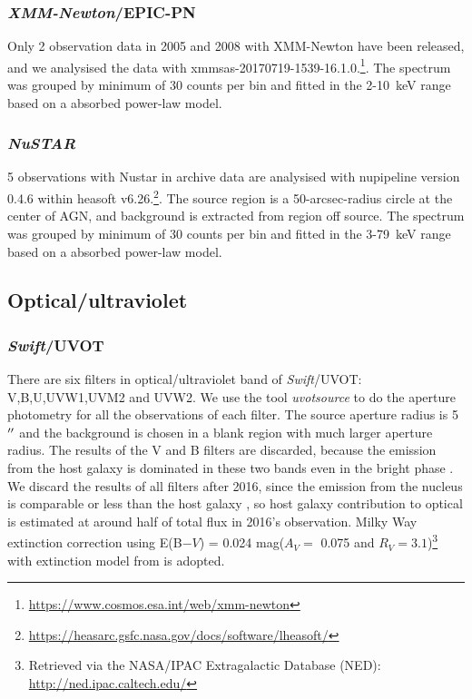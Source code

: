 \documentclass{aastex63}
\newcommand{\xmm}{{\em XMM-Newton}}
\newcommand{\nustar}{{\em NuSTAR}}
\newcommand{\swift}{{\em Swift}}
\begin{document}
\subsubsection{\xmm/EPIC-PN}
Only 2 observation data in 2005 and 2008 with XMM-Newton have been released, and we analysised the data with xmmsas-20170719-1539-16.1.0.\footnote{\url{https://www.cosmos.esa.int/web/xmm-newton}}. The spectrum was grouped by minimum of 30 counts per bin and fitted in the 2-10~keV range based on a absorbed power-law model. 

\subsubsection{\nustar}
5 observations with Nustar in archive data are analysised with nupipeline version 0.4.6 within heasoft v6.26.\footnote{\url{https://heasarc.gsfc.nasa.gov/docs/software/lheasoft/}}. The source region is a 50-arcsec-radius circle at the center of AGN, and background is extracted from region off source. The spectrum was grouped by minimum of 30 counts per bin and fitted in the 3-79~keV range based on a absorbed power-law model.


\subsection{Optical/ultraviolet}
\subsubsection{\swift/UVOT}
There are six filters in optical/ultraviolet band of \swift/UVOT: V,B,U,UVW1,UVM2 and UVW2. We use the tool \textit{uvotsource} to do the aperture photometry for all the observations of each filter. The source aperture radius is 5$\mbox{$^{\prime\prime}$}$ and the background is chosen in a blank region with much larger aperture radius. The results of the V and B filters are discarded, because the emission from the host galaxy is dominated in these two bands even in the bright phase \citep{2018MNRAS.480.3898N}. We discard the results of all filters after 2016, since the emission from the nucleus is comparable or less than the host galaxy \citep{2018MNRAS.480.3898N}, so host galaxy contribution to optical is estimated at around half of total flux in 2016's observation.  Milky Way extinction correction using \texorpdfstring{E(B$-V$) = 0.024}. mag($A_V=$ 0.075 and $R_{V}=3.1$)\footnote{Retrieved via the NASA/IPAC Extragalactic Database (NED): \url{http://ned.ipac.caltech.edu/}} with extinction model from \citet{2007ApJ...663..320F} is adopted.  
\end{document}

